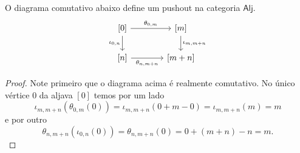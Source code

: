 \begin{lema}\label{lema:pushout_aljavas_ordinais}
    O diagrama comutativo abaixo define um pushout na categoria $\mathsf{Alj}$.
    \begin{equation}\label{eq:pushout_aljavas_ordinais_diag}
        \begin{tikzcd}[column sep=1.35cm]
            {[0]}
            \arrow[r,"{\theta_{0,m}}"]
            \arrow[d, "{\iota_{0,n}}" swap]
            & {[m]}
            \arrow[d, "{\iota_{m,m+n}}"]
            \\ {[n]}
            \arrow[r, "{\theta_{n,m+n}}" swap]
            & {[m+n]}
        \end{tikzcd}
    \end{equation}
\end{lema}

\begin{proof}
    Note primeiro que o diagrama acima é realmente comutativo.
    No único vértice $0$ da aljava $[0]$ temos por um lado
    \begin{displaymath}
        \iota_{m,m+n}(\theta_{0,m}(0))
        = \iota_{m,m+n}(0+m-0)
        = \iota_{m,m+n}(m)
        = m
    \end{displaymath}
    e por outro
    \begin{displaymath}
        \theta_{n,m+n}(\iota_{0,n}(0))
        = \theta_{n,m+n}(0)
        = 0 + (m+n) - n
        = m.
    \end{displaymath}
    

\end{proof}

